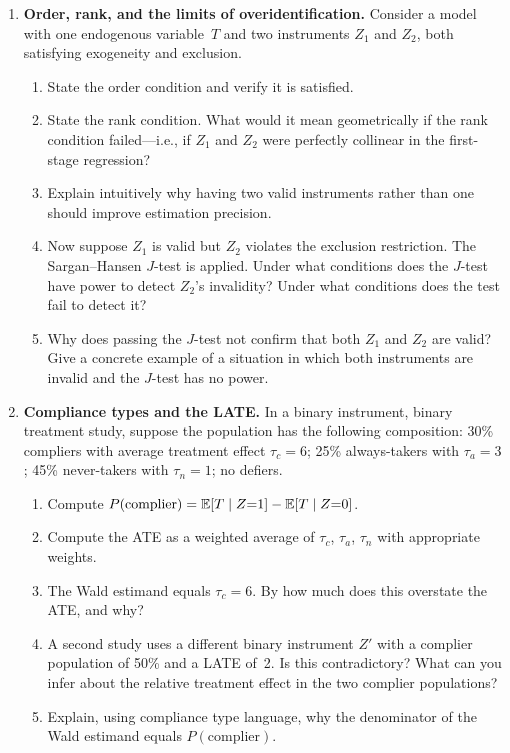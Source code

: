 \documentclass[master.tex]{subfiles}
\begin{document}
\begin{enumerate}
\item \textbf{Order, rank, and the limits of overidentification.}
  Consider a model with one endogenous variable~$T$ and two
  instruments $Z_1$ and $Z_2$, both satisfying exogeneity and
  exclusion.
  \begin{enumerate}
    \item State the order condition and verify it is satisfied.
    \item State the rank condition.  What would it mean
      geometrically if the rank condition failed---i.e., if $Z_1$
      and $Z_2$ were perfectly collinear in the first-stage
      regression?
    \item Explain intuitively why having two valid instruments
      rather than one should improve estimation precision.
    \item Now suppose $Z_1$ is valid but $Z_2$ violates the
      exclusion restriction.  The Sargan--Hansen $J$-test is
      applied.  Under what conditions does the $J$-test have
      power to detect $Z_2$'s invalidity?  Under what conditions
      does the test fail to detect it?
    \item Why does passing the $J$-test not confirm that both
      $Z_1$ and $Z_2$ are valid?  Give a concrete example of a
      situation in which both instruments are invalid and the
      $J$-test has no power.
  \end{enumerate}

\item \textbf{Compliance types and the LATE.}
  In a binary instrument, binary treatment study, suppose the
  population has the following composition: 30\% compliers with
  average treatment effect $\tau_c = 6$; 25\% always-takers with
  $\tau_a = 3$; 45\% never-takers with $\tau_n = 1$; no defiers.
  \begin{enumerate}
    \item Compute $P(\text{complier}) = \mathbb{E}[T \mid Z{=}1] -
      \mathbb{E}[T \mid Z{=}0]$.
    \item Compute the ATE as a weighted average of $\tau_c$,
      $\tau_a$, $\tau_n$ with appropriate weights.
    \item The Wald estimand equals $\tau_c = 6$.  By how much
      does this overstate the ATE, and why?
    \item A second study uses a different binary instrument $Z'$
      with a complier population of 50\% and a LATE of~2.  Is
      this contradictory?  What can you infer about the relative
      treatment effect in the two complier populations?
    \item Explain, using compliance type language, why the
      denominator of the Wald estimand equals
      $P(\text{complier})$.
  \end{enumerate}


\end{enumerate}
\end{document}
